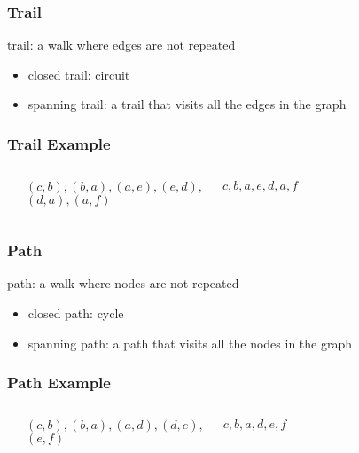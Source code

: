 \documentclass[dvipsnames]{beamer}
\begin{document}
\begin{frame}
  \frametitle{Trail}

  \begin{definition}
    \alert{trail}: a walk where edges are not repeated

    \pause
    \begin{itemize}
      \item closed trail: \alert{circuit}
      \item \alert{spanning trail}: a trail that visits all the edges in the
	graph
    \end{itemize}
  \end{definition}
\end{frame}

\begin{frame}
  \frametitle{Trail Example}

  \begin{example}
    \begin{columns}
      \begin{center}
      \end{center}

      $(c,b),(b,a),(a,e),(e,d),$\\
      $(d,a),(a,f)$

      \medskip
      $c,b,a,e,d,a,f$
    \end{columns}
  \end{example}
\end{frame}

\begin{frame}
  \frametitle{Path}

  \begin{definition}
    \alert{path}: a walk where nodes are not repeated

    \pause
    \begin{itemize}
      \item closed path: \alert{cycle}
      \item \alert{spanning path}: a path that visits all the nodes in the graph
    \end{itemize}
  \end{definition}
\end{frame}

\begin{frame}
  \frametitle{Path Example}

  \begin{example}
    \begin{columns}
      \begin{center}
      \end{center}

      $(c,b),(b,a),(a,d),(d,e),$\\
      $(e,f)$

      \medskip
      $c,b,a,d,e,f$
    \end{columns}
  \end{example}
\end{frame}
\end{document}
